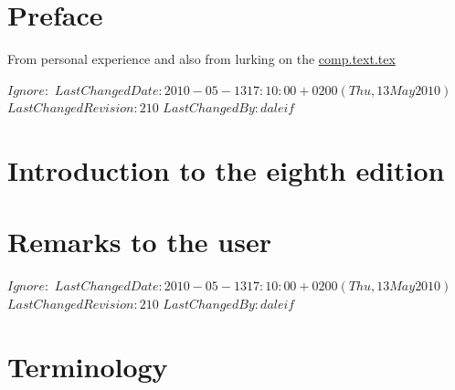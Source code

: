 \chapter{Preface}

    From personal experience and also from lurking on the \url{comp.text.tex}




\svnidlong
{$Ignore: $}
{$LastChangedDate: 2010-05-13 17:10:00 +0200 (Thu, 13 May 2010) $}
{$LastChangedRevision: 210 $}
{$LastChangedBy: daleif $}

\chapter{Introduction to the eighth edition}


\chapter{Remarks to the user}




\svnidlong
{$Ignore: $}
{$LastChangedDate: 2010-05-13 17:10:00 +0200 (Thu, 13 May 2010) $}
{$LastChangedRevision: 210 $}
{$LastChangedBy: daleif $}

\chapter{Terminology}

